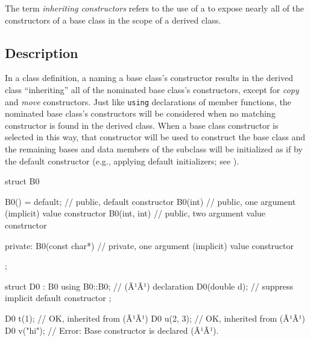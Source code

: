 


\label{inheriting-constructors}
\setcounter{table}{0}
\setcounter{footnote}{0}
\setcounter{lstlisting}{0}



The term \emph{inheriting constructors} refers to the use of a
 to expose nearly all of the
constructors of a base class in the scope of a derived class.

\subsection[Description]{Description}\label{description-inheritingctor}

In a class definition, a  naming a
base class's constructor results in the derived class ``inheriting'' all
of the nominated base class's constructors, except for \emph{copy} and
\emph{move} constructors. Just like \lstinline!using! declarations of member functions, the nominated base class's
constructors will be considered when no matching constructor is found in
the derived class. When a base class constructor is selected in this way,
that constructor will be used to construct the base class and the
remaining bases and data members of the subclass will be initialized as
if by the default constructor (e.g., applying default initializers;
see ).

\begin{emcppslisting}[language=C++]
struct B0
{
    B0() = default;      // public, default constructor
    B0(int)         { }  // public, one argument (implicit) value constructor
    B0(int, int)    { }  // public, two argument value constructor

private:
    B0(const char*) { }  // private, one argument (implicit) value constructor
};

struct D0 : B0
{
    using B0::B0;  // (Ã¹{}Ã¹) declaration
    D0(double d);  // suppress implicit default constructor
};

D0 t(1);     // OK, inherited from (Ã¹{}Ã¹)
D0 u(2, 3);  // OK, inherited from (Ã¹{}Ã¹)
D0 v("hi");  // Error: Base constructor is declared (Ã¹{}Ã¹).
\end{emcppslisting}
    
